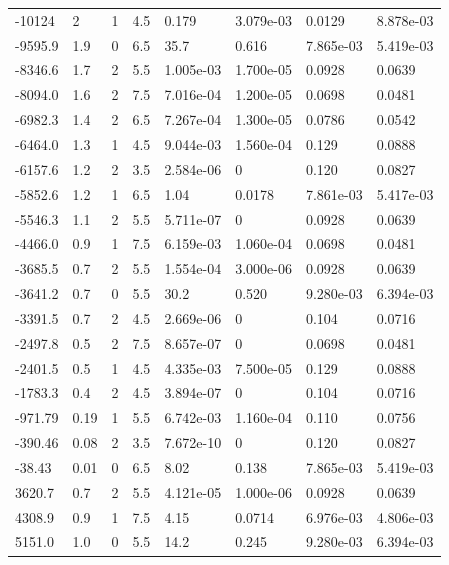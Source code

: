 \documentclass[preview]{standalone}
\begin{document}
{{\begin{tabular}{L{1.2cm}C{1.2cm} C{0.3cm}C{0.5cm} C{1.4cm}C{1.4cm} C{1.4cm}C{1.4cm}}
  -10124  &     2  & 1     & 4.5 &  0.179  & 3.079e-03  & 0.0129 &  8.878e-03   \\ 
  -9595.9  &   1.9  & 0     & 6.5 &  35.7  & 0.616  & 7.865e-03 &  5.419e-03   \\ 
  -8346.6  &   1.7  & 2     & 5.5 &  1.005e-03  & 1.700e-05  & 0.0928 &  0.0639   \\ 
  -8094.0  &   1.6  & 2     & 7.5 &  7.016e-04  & 1.200e-05  & 0.0698 &  0.0481   \\ 
  -6982.3  &   1.4  & 2     & 6.5 &  7.267e-04  & 1.300e-05  & 0.0786 &  0.0542   \\ 
  -6464.0  &   1.3  & 1     & 4.5 &  9.044e-03  & 1.560e-04  & 0.129 &  0.0888   \\ 
  -6157.6  &   1.2  & 2     & 3.5 &  2.584e-06  & 0  & 0.120 &  0.0827   \\ 
  -5852.6  &   1.2  & 1     & 6.5 &  1.04  & 0.0178  & 7.861e-03 &  5.417e-03   \\ 
  -5546.3  &   1.1  & 2     & 5.5 &  5.711e-07  & 0  & 0.0928 &  0.0639   \\ 
  -4466.0  &   0.9  & 1     & 7.5 &  6.159e-03  & 1.060e-04  & 0.0698 &  0.0481   \\ 
  -3685.5  &   0.7  & 2     & 5.5 &  1.554e-04  & 3.000e-06  & 0.0928 &  0.0639   \\ 
  -3641.2  &   0.7  & 0     & 5.5 &  30.2  & 0.520  & 9.280e-03 &  6.394e-03   \\ 
  -3391.5  &   0.7  & 2     & 4.5 &  2.669e-06  & 0  & 0.104 &  0.0716   \\ 
  -2497.8  &   0.5  & 2     & 7.5 &  8.657e-07  & 0  & 0.0698 &  0.0481   \\ 
  -2401.5  &   0.5  & 1     & 4.5 &  4.335e-03  & 7.500e-05  & 0.129 &  0.0888   \\ 
  -1783.3  &   0.4  & 2     & 4.5 &  3.894e-07  & 0  & 0.104 &  0.0716   \\ 
  -971.79  &  0.19  & 1     & 5.5 &  6.742e-03  & 1.160e-04  & 0.110 &  0.0756   \\ 
  -390.46  &  0.08  & 2     & 3.5 &  7.672e-10  & 0  & 0.120 &  0.0827   \\ 
  -38.43  &  0.01  & 0     & 6.5 &  8.02  & 0.138  & 7.865e-03 &  5.419e-03   \\ 
  3620.7  &   0.7  & 2     & 5.5 &  4.121e-05  & 1.000e-06  & 0.0928 &  0.0639   \\ 
  4308.9  &   0.9  & 1     & 7.5 &  4.15  & 0.0714  & 6.976e-03 &  4.806e-03   \\ 
  5151.0  &   1.0  & 0     & 5.5 &  14.2  & 0.245  & 9.280e-03 &  6.394e-03   \\ 

\end{tabular}}}
\end{document}
